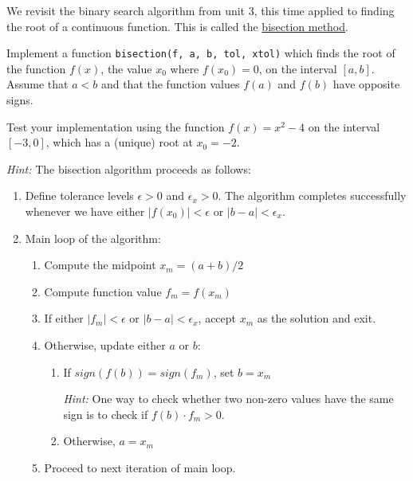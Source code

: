 \documentclass[10pt]{scrartcl}
\providecommand{\tightlist}{%
      \setlength{\itemsep}{0pt}\setlength{\parskip}{0pt}}
\begin{document}
We revisit the binary search algorithm from unit 3, this time applied to
finding the root of a continuous function. This is called the
\href{https://en.wikipedia.org/wiki/Bisection_method}{bisection method}.

Implement a function \texttt{bisection(f,\ a,\ b,\ tol,\ xtol)} which
finds the root of the function \(f(x)\), \ie the value \(x_0\) where
\(f(x_0) = 0\), on the interval \([a,b]\). Assume that \(a<b\) and that
the function values \(f(a)\) and \(f(b)\) have opposite signs.

Test your implementation using the function \(f(x) = x^2 - 4\) on the
interval \([-3,0]\), which has a (unique) root at \(x_0 = -2\).

\emph{Hint:} The bisection algorithm proceeds as follows:

\begin{enumerate}
\def\labelenumi{\arabic{enumi}.}
\tightlist
\item
  Define tolerance levels \(\epsilon > 0\) and \(\epsilon_x > 0\). The
  algorithm completes successfully whenever we have either
  \(|f(x_0)| < \epsilon\) or \(|b-a|<\epsilon_x\).
\item
  Main loop of the algorithm:

  \begin{enumerate}
  \def\labelenumii{\arabic{enumii}.}
  \tightlist
  \item
    Compute the midpoint \(x_m = (a+b)/2\)
  \item
    Compute function value \(f_m = f(x_m)\)
  \item
    If either \(|f_m| < \epsilon\) or \(|b-a|< \epsilon_x\), accept
    \(x_m\) as the solution and exit.
  \item
    Otherwise, update either \(a\) or \(b\):

    \begin{enumerate}
    \def\labelenumiii{\arabic{enumiii}.}
    \item
      If \(sign(f(b)) = sign(f_m)\), set \(b = x_m\)

      \emph{Hint:} One way to check whether two non-zero values have the
      same sign is to check if \(f(b) \cdot f_m > 0\).
    \item
      Otherwise, \(a = x_m\)
    \end{enumerate}
  \item
    Proceed to next iteration of main loop.
  \end{enumerate}
\end{enumerate}
\end{document}
